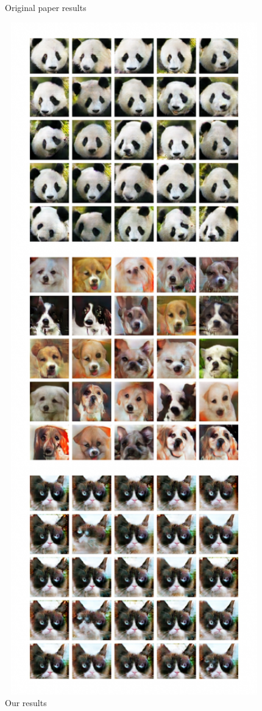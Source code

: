 \documentclass[12pt]{article}
\begin{document}
\begin{center}
\begin{minipage}[t]{0.48\textwidth}
\begin{figure}[H]
			\caption{Original paper results}
		\end{figure}
	\end{minipage}
	\begin{minipage}[t]{0.48\textwidth} 
		\begin{figure}[H]
			\includegraphics[width=1\textwidth]{Images/experiment.jpg}
			\caption{Our results}
		\end{figure}
	\end{minipage}
\end{center}
\end{document}
